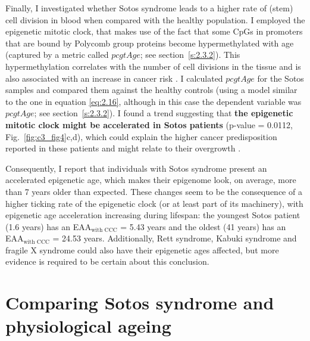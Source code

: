 \bigskip

Finally, I investigated whether Sotos syndrome leads to a higher rate of (stem) cell division in blood when compared with the healthy population. I employed the epigenetic mitotic clock, that makes use of the fact that some CpGs in promoters that are bound by Polycomb group proteins become hypermethylated with age (captured by a metric called $pcgtAge$; see section~\ref{s:2.3.2}). This hypermethylation correlates with the number of cell divisions in the tissue and is also associated with an increase in cancer risk \cite{Yang2016}. I calculated $pcgtAge$ for the Sotos samples and compared them against the healthy controls (using a model similar to the one in equation \ref{eq:2.16}, although in this case the dependent variable was $pcgtAge$; see section~\ref{s:2.3.2}). I found a trend suggesting that \textbf{the epigenetic mitotic clock might be accelerated in Sotos patients} (p-value = 0.0112, Fig.~\ref{fig:c3_fig4}c,d), which could explain the higher cancer predisposition reported in these patients and might relate to their overgrowth \cite{Leventopoulos2009}.

\bigskip

Consequently, I report that individuals with Sotos syndrome present an accelerated epigenetic age, which makes their epigenome look, on average, more than 7 years older than expected. These changes seem to be the consequence of a higher ticking rate of the epigenetic clock (or at least part of its machinery), with epigenetic age acceleration increasing during lifespan: the youngest Sotos patient (1.6 years) has an EAA$_{\text{with CCC}}$ = 5.43 years and the oldest (41 years) has an EAA$_{\text{with CCC}}$ = 24.53 years. Additionally, Rett syndrome, Kabuki syndrome and fragile X syndrome could also have their epigenetic ages affected, but more evidence is required to be certain about this conclusion.


\section{Comparing Sotos syndrome and physiological ageing}

\smallskip

